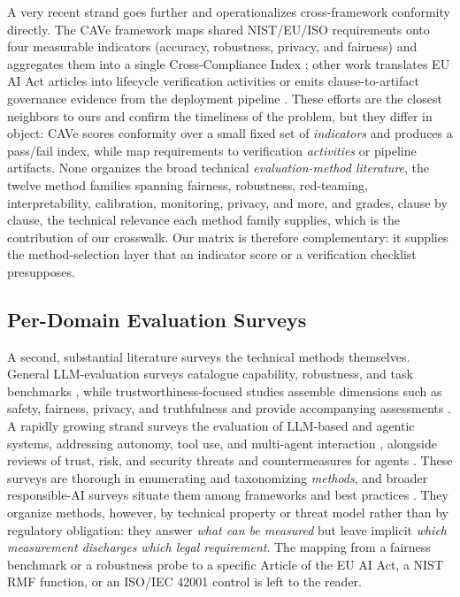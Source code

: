 A very recent strand goes further and operationalizes cross-framework conformity directly. The CAVe framework maps shared NIST/EU/ISO requirements onto four measurable indicators (accuracy, robustness, privacy, and fairness) and aggregates them into a single Cross-Compliance Index \cite{min2026cave}; other work translates EU AI Act articles into lifecycle verification activities \cite{buscemi2025assessing} or emits clause-to-artifact governance evidence from the deployment pipeline \cite{butt2026policy}. These efforts are the closest neighbors to ours and confirm the timeliness of the problem, but they differ in object: CAVe scores conformity over a small fixed set of \emph{indicators} and produces a pass/fail index, while \cite{buscemi2025assessing,butt2026policy} map requirements to verification \emph{activities} or pipeline artifacts. None organizes the broad technical \emph{evaluation-method literature}, the twelve method families spanning fairness, robustness, red-teaming, interpretability, calibration, monitoring, privacy, and more, and grades, clause by clause, the technical relevance each method family supplies, which is the contribution of our crosswalk. Our matrix is therefore complementary: it supplies the method-selection layer that an indicator score or a verification checklist presupposes.

\subsection{Per-Domain Evaluation Surveys}

A second, substantial literature surveys the technical methods themselves. General LLM-evaluation surveys catalogue capability, robustness, and task benchmarks \cite{chang2024survey, liang2023holistic}, while trustworthiness-focused studies assemble dimensions such as safety, fairness, privacy, and truthfulness and provide accompanying assessments \cite{huang2024trustllm, wang2023decodingtrust}. A rapidly growing strand surveys the evaluation of LLM-based and agentic systems, addressing autonomy, tool use, and multi-agent interaction \cite{yehudai2025survey, mohammadi2025evaluation}, alongside reviews of trust, risk, and security threats and countermeasures for agents \cite{yu2025survey, gan2024navigating, raza2025trism, qi2026trustworthy}. These surveys are thorough in enumerating and taxonomizing \textit{methods}, and broader responsible-AI surveys situate them among frameworks and best practices \cite{gadekallu2025responsibleaisurvey}. They organize methods, however, by technical property or threat model rather than by regulatory obligation: they answer \textit{what can be measured} but leave implicit \textit{which measurement discharges which legal requirement}. The mapping from a fairness benchmark or a robustness probe to a specific Article of the EU AI Act, a NIST RMF function, or an ISO/IEC 42001 control is left to the reader.

